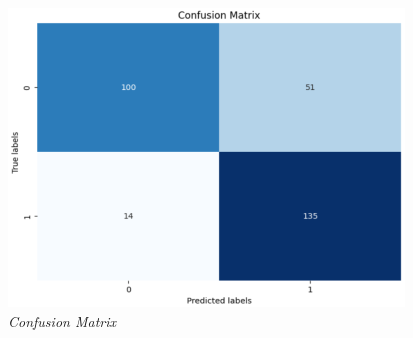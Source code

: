 \documentclass[12pt, a4paper]{report}
\begin{document}
\begin{figure}[htbp]
    \hspace{0.03\textwidth}
    \begin{minipage}{0.3\textwidth}
        \centering
        \includegraphics[width=\linewidth]{report images/image29.png}
        \caption{\textit{Confusion Matrix}}
    \end{minipage}
\end{figure}
\end{document}
